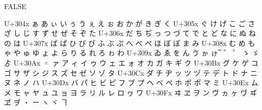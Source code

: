\documentclass{ltjarticle}\usepackage{luatexja-adjust}
\begin{document}
\par
\newpage\ltjenableadjust[combinevoicedkana=false] FALSE
{\obeylines\ttfamily
U+304x          ぁ      あ      ぃ      い      ぅ      う      ぇ      え      ぉ      お      か      が      き      ぎ      く
U+305x  ぐ      け      げ      こ      ご      さ      ざ      し      じ      す      ず      せ      ぜ      そ      ぞ      た
U+306x  だ      ち      ぢ      っ      つ      づ      て      で      と      ど      な      に      ぬ      ね      の      は
U+307x  ば      ぱ      ひ      び      ぴ      ふ      ぶ      ぷ      へ      べ      ぺ      ほ      ぼ      ぽ      ま      み
U+308x  む      め      も      ゃ      や      ゅ      ゆ      ょ      よ      ら      り      る      れ      ろ      ゎ      わ
U+309x  ゐ      ゑ      を      ん      ゔ      ゕ      ゖ                      ゙        ゚        ゛      ゜      ゝ      ゞ      ゟ 
U+30Ax  ゠      ァ      ア      ィ      イ      ゥ      ウ      ェ      エ      ォ      オ      カ      ガ      キ      ギ      ク
U+30Bx  グ      ケ      ゲ      コ      ゴ      サ      ザ      シ      ジ      ス      ズ      セ      ゼ      ソ      ゾ      タ
U+30Cx  ダ      チ      ヂ      ッ      ツ      ヅ      テ      デ      ト      ド      ナ      ニ      ヌ      ネ      ノ      ハ
U+30Dx  バ      パ      ヒ      ビ      ピ      フ      ブ      プ      ヘ      ベ      ペ      ホ      ボ      ポ      マ      ミ
U+30Ex  ム      メ      モ      ャ      ヤ      ュ      ユ      ョ      ヨ      ラ      リ      ル      レ      ロ      ヮ      ワ
U+30Fx  ヰ      ヱ      ヲ      ン      ヴ      ヵ      ヶ      ヷ      ヸ      ヹ      ヺ      ・      ー      ヽ      ヾ      ヿ 
\par}
\end{document}
